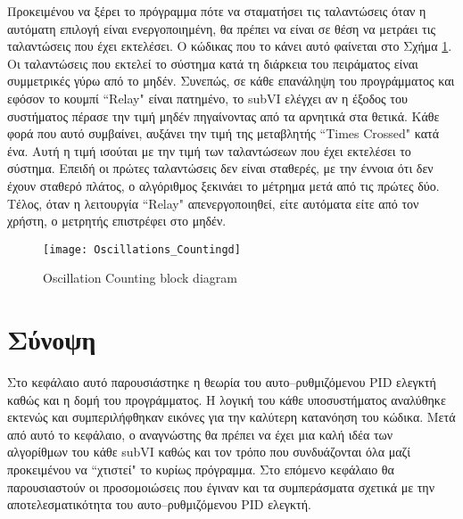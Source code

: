 Προκειμένου να ξέρει το πρόγραμμα πότε να σταματήσει τις ταλαντώσεις όταν η αυτόματη επιλογή είναι ενεργοποιημένη, θα πρέπει να είναι σε θέση να μετράει τις ταλαντώσεις που έχει εκτελέσει. Ο κώδικας που το κάνει αυτό φαίνεται στο Σχήμα \ref{fig:Oscillations_Countingd}. Οι ταλαντώσεις που εκτελεί το σύστημα κατά τη διάρκεια του πειράματος είναι συμμετρικές γύρω από το μηδέν. Συνεπώς, σε κάθε επανάληψη του προγράμματος και εφόσον το κουμπί ``Relay" είναι πατημένο, το subVI ελέγχει αν η έξοδος του συστήματος πέρασε την τιμή μηδέν πηγαίνοντας από τα αρνητικά στα θετικά. Κάθε φορά που αυτό συμβαίνει, αυξάνει την τιμή της μεταβλητής ``Times Crossed" κατά ένα. Αυτή η τιμή ισούται με την τιμή των ταλαντώσεων που έχει εκτελέσει το σύστημα. Επειδή οι πρώτες ταλαντώσεις δεν είναι σταθερές, με την έννοια ότι δεν έχουν σταθερό πλάτος, ο αλγόριθμος ξεκινάει το μέτρημα μετά από τις πρώτες δύο. Τέλος, όταν η λειτουργία ``Relay" απενεργοποιηθεί, είτε αυτόματα είτε από τον χρήστη, ο μετρητής επιστρέφει στο μηδέν.

\begin{figure}[h]
  \centering
  \texttt{[image: Oscillations\_Countingd]}
  \caption{Oscillation Counting block diagram}
  \label{fig:Oscillations_Countingd}
\end{figure}

\section{Σύνοψη}

Στο κεφάλαιο αυτό παρουσιάστηκε η θεωρία του αυτο--ρυθμιζόμενου PID ελεγκτή καθώς και η δομή του προγράμματος. Η λογική του κάθε υποσυστήματος αναλύθηκε εκτενώς και συμπεριλήφθηκαν εικόνες για την καλύτερη κατανόηση του κώδικα. Μετά από αυτό το κεφάλαιο, ο αναγνώστης θα πρέπει να έχει μια καλή ιδέα των αλγορίθμων του κάθε subVI καθώς και τον τρόπο που συνδυάζονται όλα μαζί προκειμένου να ``χτιστεί" το κυρίως πρόγραμμα. Στο επόμενο κεφάλαιο θα παρουσιαστούν οι προσομοιώσεις που έγιναν και τα συμπεράσματα σχετικά με την αποτελεσματικότητα του αυτο--ρυθμιζόμενου PID ελεγκτή.
